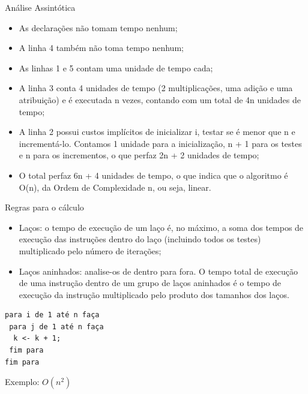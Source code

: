 \documentclass[12pt,table,xcolor={dvipsnames}]{beamer}
\begin{document}
\begin{frame}[fragile]{Análise Assintótica}
\begin{itemize}
\item As declarações não tomam tempo nenhum;
\item A linha 4 também não toma tempo nenhum;
\item As linhas 1 e 5 contam uma unidade de tempo cada;
\item A linha 3 conta 4 unidades de tempo (2 multiplicações, uma adição e uma atribuição) e é executada n vezes, contando com um total de 4n unidades de tempo;
\item A linha 2 possui custos implícitos de inicializar i, testar se é menor que n e incrementá-lo. Contamos 1 unidade para a inicialização, n + 1 para os testes e n para os incrementos, o que perfaz 2n + 2 unidades de tempo;
\item O total perfaz 6n + 4 unidades de tempo, o que indica que o algoritmo é O(n), da Ordem de Complexidade n, ou seja, linear.
\end{itemize}
\end{frame}

\begin{frame}[fragile]{Regras para o cálculo}
\begin{itemize}
\item Laços: o tempo de execução de um laço é, no máximo, a soma dos tempos de execução das instruções dentro do laço (incluindo todos os testes) multiplicado pelo número de iterações;
\item Laços aninhados: analise-os de dentro para fora. O tempo total de execução de uma instrução dentro de um grupo de laços aninhados é o tempo de execução da instrução multiplicado pelo produto dos tamanhos dos laços.
\end{itemize}
\begin{lstlisting}
para i de 1 até n faça
 para j de 1 até n faça
  k <- k + 1;
 fim para
fim para
\end{lstlisting}
Exemplo: $O(n^2)$
\end{frame}
\end{document}

